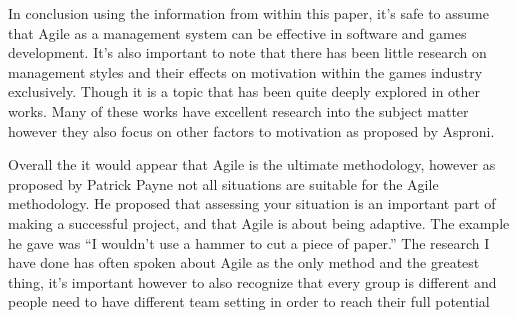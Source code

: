 \documentclass{scrartcl}
\begin{document}
In conclusion using the information from within this paper, it's safe to assume that Agile as a management system can be effective in software and games development. It's also important to note that there has been little research on management styles and their effects on motivation within the games industry exclusively. Though it is a topic that has been quite deeply explored in other works. \cite {EnhancePerformance,SoftwareProcess,LargeAgile,MicrosoftExp,UsingAgile,AgileDevelopment,MotivationTeamwork} Many of these works have excellent research into the subject matter however they also focus on other factors to motivation as proposed by Asproni.

Overall the it would appear that Agile is the ultimate methodology, however as proposed by Patrick Payne not all situations are suitable for the Agile methodology. He proposed that assessing your situation is an important part of making a successful project, and that Agile is about being adaptive. The example he gave was ``I wouldn't use a hammer to cut a piece of paper.''  The research I have done has often spoken about Agile as the only method and the greatest thing, it's important however to also recognize that every group is different and people need to have different team setting in order to reach their full potential



\end{document}
